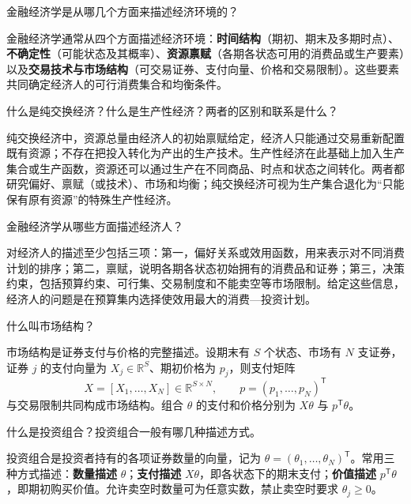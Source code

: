 
\begin{problem}
 金融经济学是从哪几个方面来描述经济环境的？
\end{problem}
\begin{solution}
金融经济学通常从四个方面描述经济环境：\textbf{时间结构}（期初、期末及多期时点）、\textbf{不确定性}（可能状态及其概率）、\textbf{资源禀赋}（各期各状态可用的消费品或生产要素）以及\textbf{交易技术与市场结构}（可交易证券、支付向量、价格和交易限制）。这些要素共同确定经济人的可行消费集合和均衡条件。
\end{solution}

\begin{problem}
 什么是纯交换经济？什么是生产性经济？两者的区别和联系是什么？
\end{problem}
\begin{solution}
纯交换经济中，资源总量由经济人的初始禀赋给定，经济人只能通过交易重新配置既有资源；不存在把投入转化为产出的生产技术。生产性经济在此基础上加入生产集合或生产函数，资源还可以通过生产在不同商品、时点和状态之间转化。两者都研究偏好、禀赋（或技术）、市场和均衡；纯交换经济可视为生产集合退化为“只能保有原有资源”的特殊生产性经济。
\end{solution}

\begin{problem}
 金融经济学从哪些方面描述经济人？
\end{problem}
\begin{solution}
对经济人的描述至少包括三项：第一，偏好关系或效用函数，用来表示对不同消费计划的排序；第二，禀赋，说明各期各状态初始拥有的消费品和证券；第三，决策约束，包括预算约束、可行集、交易制度和不能卖空等市场限制。给定这些信息，经济人的问题是在预算集内选择使效用最大的消费—投资计划。
\end{solution}

\begin{problem}
 什么叫市场结构？
\end{problem}
\begin{solution}
市场结构是证券支付与价格的完整描述。设期末有 $S$ 个状态、市场有 $N$ 支证券，证券 $j$ 的支付向量为 $X_j\in\mathbb{R}^{S}$、期初价格为 $p_j$，则支付矩阵
\[
 X=[X_1,\ldots,X_N]\in\mathbb{R}^{S\times N},\qquad p=(p_1,\ldots,p_N)^{\mathsf T}
\]
与交易限制共同构成市场结构。组合 $\theta$ 的支付和价格分别为 $X\theta$ 与 $p^{\mathsf T}\theta$。
\end{solution}

\begin{problem}
 什么是投资组合？投资组合一般有哪几种描述方式。
\end{problem}
\begin{solution}
投资组合是投资者持有的各项证券数量的向量，记为 $\theta=(\theta_1,\ldots,\theta_N)^{\mathsf T}$。常用三种方式描述：\textbf{数量描述} $\theta$；\textbf{支付描述} $X\theta$，即各状态下的期末支付；\textbf{价值描述} $p^{\mathsf T}\theta$，即期初购买价值。允许卖空时数量可为任意实数，禁止卖空时要求 $\theta_j\ge0$。
\end{solution}


